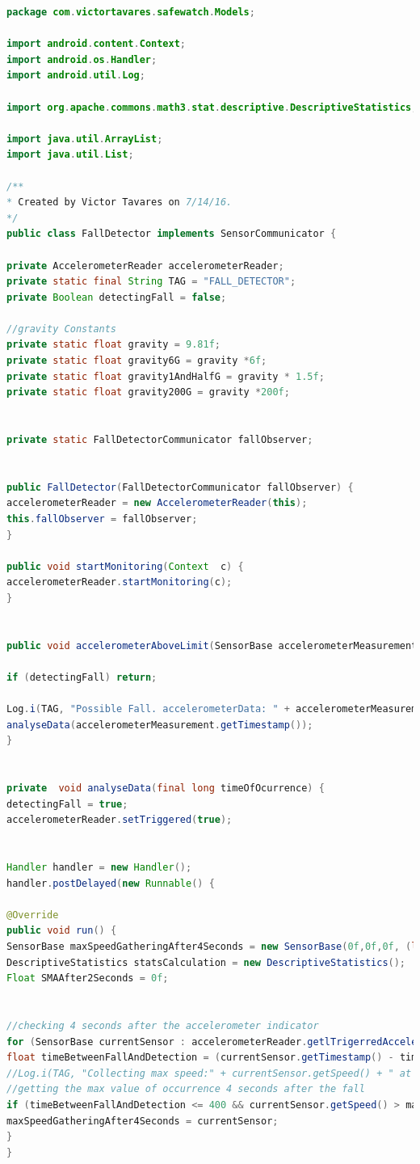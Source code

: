  \begin{lstlisting}[caption=Algoritmo de Detecção de Quedas em Java, label=cod:java, language=JAVA, frame=single, breaklines=true]
package com.victortavares.safewatch.Models;

import android.content.Context;
import android.os.Handler;
import android.util.Log;

import org.apache.commons.math3.stat.descriptive.DescriptiveStatistics;

import java.util.ArrayList;
import java.util.List;

/**
* Created by Victor Tavares on 7/14/16.
*/
public class FallDetector implements SensorCommunicator {

private AccelerometerReader accelerometerReader;
private static final String TAG = "FALL_DETECTOR";
private Boolean detectingFall = false;

//gravity Constants
private static float gravity = 9.81f;
private static float gravity6G = gravity *6f;
private static float gravity1AndHalfG = gravity * 1.5f;
private static float gravity200G = gravity *200f;


private static FallDetectorCommunicator fallObserver;


public FallDetector(FallDetectorCommunicator fallObserver) {
accelerometerReader = new AccelerometerReader(this);
this.fallObserver = fallObserver;
}

public void startMonitoring(Context  c) {
accelerometerReader.startMonitoring(c);
}


public void accelerometerAboveLimit(SensorBase accelerometerMeasurement) {

if (detectingFall) return;

Log.i(TAG, "Possible Fall. accelerometerData: " + accelerometerMeasurement.getSpeed()/gravity + " at " + accelerometerMeasurement.getDate() + " on " + accelerometerMeasurement.getTimestamp());
analyseData(accelerometerMeasurement.getTimestamp());
}


private  void analyseData(final long timeOfOcurrence) {
detectingFall = true;
accelerometerReader.setTriggered(true);


Handler handler = new Handler();
handler.postDelayed(new Runnable() {

@Override
public void run() {
SensorBase maxSpeedGatheringAfter4Seconds = new SensorBase(0f,0f,0f, (long) 0);
DescriptiveStatistics statsCalculation = new DescriptiveStatistics();
Float SMAAfter2Seconds = 0f;


//checking 4 seconds after the accelerometer indicator
for (SensorBase currentSensor : accelerometerReader.getlTrigerredAccelerometerData()) {
float timeBetweenFallAndDetection = (currentSensor.getTimestamp() - timeOfOcurrence);
//Log.i(TAG, "Collecting max speed:" + currentSensor.getSpeed() + " at " + currentSensor.getDate() + " on " + currentSensor.getTimestamp() );
//getting the max value of occurrence 4 seconds after the fall
if (timeBetweenFallAndDetection <= 400 && currentSensor.getSpeed() > maxSpeedGatheringAfter4Seconds.getSpeed()) {
maxSpeedGatheringAfter4Seconds = currentSensor;
}
}



\end{lstlisting}
